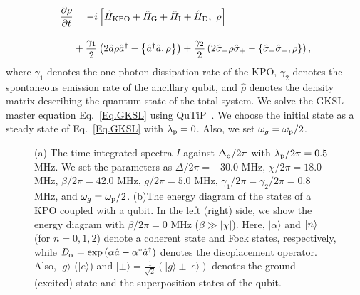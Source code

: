 \begin{align}\label{Eq.GKSL}
\frac{\partial\rho}{\partial t} &= -i\left[\hat{H}_{\rm{KPO}}+\hat{H}_{\rm{G}}+\hat{H}_{\rm{I}}+\hat{H}_{\rm{D}} 
,\ \rho\right] \nn[10pt]
&+\frac{\gamma_1}{2} \left (2\hat a \rho \hat a^\dagger - \left\{ \hat a^\dagger \hat a, \rho \right\}\right)
+ \frac{\gamma_2}{2} \left (2\hat{\sigma}_{-} \rho \hat{\sigma}_{+} - \left\{ \hat{\sigma}_{+} \hat{\sigma}_{-}, \rho \right\}\right),
\end{align}
where $\gamma_1$ denotes the one photon dissipation rate of the KPO, $\gamma_2$ denotes the spontaneous emission rate of the ancillary qubit, and
$\hat{\rho}$ denotes the density matrix describing the quantum state of the total system.
We solve the GKSL master equation Eq.~\eqref{Eq.GKSL} using QuTiP~\cite{johansson2012qutip}.
We choose the initial state as a
steady state of Eq.~\eqref{Eq.GKSL} with $\lambda _{\rm{p}}=0$.
Also, we set $\omega_g=\omega_{\rm{p}}/2$.

\begin{figure}%
\centering
\caption{
(a) The time-integrated spectra $I$ against $\Delta_{\rm{q}}/2\pi$ with $\lambda_{\rm{p}}/2\pi=0.5$  MHz. We set the parameters as $\Delta/2\pi=-30.0$  MHz, $\chi/2\pi=18.0$ MHz, $\beta/2\pi=42.0$ MHz, $g/2\pi=5.0$ MHz, $\gamma_1/2\pi=\gamma_2/2\pi=0.8$ MHz, and $\omega_g=\omega_{\rm{p}}/2$.
(b)The energy diagram of the states of a KPO coupled with a qubit.
In the left (right) side, we show the energy diagram with $\beta/2\pi=0$ MHz ($\beta\gg |\chi|$). Here,
$|\alpha \rangle $ and $\ket{n}$ (for $n=0,1,2$) denote a coherent state
 and Fock states, respectively, while
${\it{D}}_{ \alpha}=\exp{(\alpha\hat{a}-\alpha^{\ast}\hat{a}^\dagger)}$
denotes the discplacement operator. 
Also, $|g\rangle $ ($|e\rangle $) and $|\pm \rangle =\frac{1}{\sqrt{2}}(|g\rangle \pm |e\rangle )$
denotes the ground (excited) state and the superposition states of the qubit.
}
\label{fig:spect1}
\end{figure}





